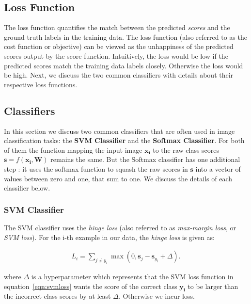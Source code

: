 \subsection{Loss Function}
\label{subsec:lossfunction}

The loss function quantifies the match between the predicted \textit{scores} and the ground truth labels in the training data. The loss function (also referred to as the cost function or objective) can be viewed as the unhappiness of the predicted scores output by the score function. Intuitively, the loss would be low if the predicted scores match the training data labels closely. Otherwise the loss would be high. Next, we discuss the two common classifiers with details about their respective loss functions. 

\subsection{Classifiers}
\label{subsec:classifiers}

In this section we discuss two common classifiers that are often used in image classification tasks: the \textbf{SVM Classifier} and the \textbf{Softmax Classifier}. For both of them the function mapping the input image $\boldsymbol{x_{i}}$ to the raw class scores $\boldsymbol{s} = f(\boldsymbol{x_{i}}, \boldsymbol{W})$ remains the same. But the Softmax classifier has one additional step : it uses the softmax function to squash the raw scores in $\boldsymbol{s}$ into a vector of values between zero and one, that sum to one.  We discuss the details of each classifier below.

\subsubsection{SVM Classifier}
\label{subsubsec:svmclassifier}

The SVM classifier uses the \textit{hinge loss} (also referred to as \textit{max-margin loss}, or \textit{SVM loss}). For the i-th example in our data, the \textit{hinge loss} is given as:

\begin{align}
L_{i} = \sum_{j \neq y_{i}} \max(0, \boldsymbol{s}_{j} - \boldsymbol{s}_{y_{i}} + \Delta).\label{eqn:svmloss}
\end{align}

where $\Delta$ is a hyperparameter which represents that the SVM loss function in equation~\ref{eqn:svmloss} wants the score of the correct class $\boldsymbol{y_{i}}$ to be larger than the incorrect class scores by at least $\Delta$. Otherwise we incur loss. 

